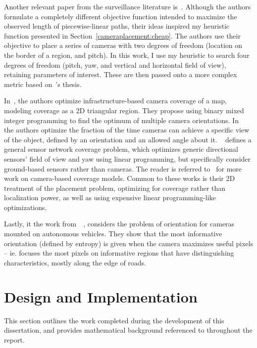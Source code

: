 \documentclass[a4paper,12pt,twoside,openright]{report}
\begin{document}
Another relevant paper from the surveillance literature is~\cite{bodor2007optimal}.
Although the authors formulate a completely different objective function intended
to maximize the observed length of piecewise-linear paths,
their ideas inspired my heuristic function presented 
in Section~\ref{cameraplacement:cheap}. The authors use their objective
to place a series of cameras with two degrees of freedom (location
on the border of a region, and pitch). In this work, I use my heuristic
to search four degrees of freedom (pitch, yaw, and vertical and
horizontal field of view), retaining parameters of interest. 
These are then passed onto a more complex metric based on~\citeauthor{beinhofer2014landmark}'s thesis.

In~\cite{horster2006optimal}, the authors optimize infrastructure-based camera coverage of a map,
modeling coverage as a 2D triangular region. They propose using binary
mixed integer programming to find the optimum of multiple camera orientations.
In~\cite{wang2013achieving} the authors optimize the fraction of the time cameras
can achieve a specific view of the object, defined by an orientation and an allowed angle about it.
~\cite{osais2010directional} defines a general sensor network coverage problem, which optimizes generic directional sensors'
field of view and yaw using linear programming, but specifically consider ground-based
sensors rather than cameras. The reader is referred to~\cite{guvensan2011coverage} for more work
on camera-based coverage models. Common to these works is their 2D treatment of the placement
problem, optimizing for coverage rather than localization power,
as well as using expensive linear programming-like optimizations.

Lastly, it the work from~\citeauthor{bansal2014understanding}~\cite{bansal2014understanding}, 
considers the problem of orientation for cameras mounted on autonomous vehicles.
They show that the most informative orientation (defined by entropy) is given when the 
camera maximizes useful pixels -- ie. focuses the most pixels on informative regions
that have distinguishing characteristics, mostly along the edge of roads.


\chapter{Design and Implementation}
\label{chap:impl}

This section outlines the work completed during the development
of this dissertation, and provides mathematical background
referenced to throughout the report.
\end{document}
